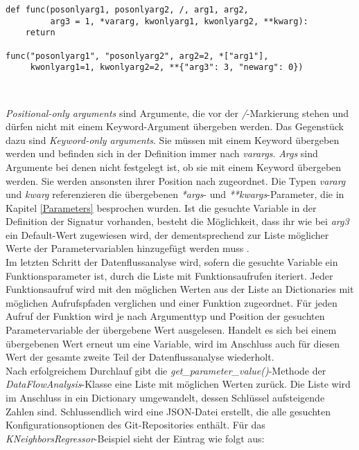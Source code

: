 \documentclass[german,bachelor]{swsLeipzig}
\begin{document}
\noindent\begin{minipage}{\linewidth}
\begin{lstlisting}[language=iPython, frame=single, basicstyle=\small, label=args, caption={Parametertypen von Funktionen},captionpos=b]
def func(posonlyarg1, posonlyarg2, /, arg1, arg2,
         arg3 = 1, *vararg, kwonlyarg1, kwonlyarg2, **kwarg):
    return

func("posonlyarg1", "posonlyarg2", arg2=2, *["arg1"],
     kwonlyarg1=1, kwonlyarg2=2, **{"arg3": 3, "newarg": 0})
\end{lstlisting}
\end{minipage}
\

\noindent \textit{Positional-only arguments} sind Argumente, die vor der \textit{/}-Markierung stehen und dürfen nicht mit einem
Keyword-Argument übergeben werden.
Das Gegenstück dazu sind \textit{Keyword-only arguments}.
Sie müssen mit einem Keyword übergeben werden und befinden sich in der Definition immer nach \textit{varargs}.
\textit{Args} sind Argumente bei denen nicht festgelegt ist, ob sie mit einem Keyword übergeben werden.
Sie werden ansonsten ihrer Position nach zugeordnet.
Die Typen \textit{vararg} und \textit{kwarg} referenzieren die übergebenen \textit{*args}- und \textit{**kwargs}-Parameter,
die in Kapitel \ref{Parameters} besprochen wurden.
Ist die gesuchte Variable in der Definition der Signatur vorhanden, besteht die Möglichkeit, dass ihr wie bei \textit{arg3} ein Default-Wert
zugewiesen wird, der dementsprechend zur Liste möglicher Werte der Parametervariablen hinzugefügt werden muss \cite[]{9425916}.\\
\indent Im letzten Schritt der Datenflussanalyse wird, sofern die gesuchte Variable ein Funktionsparameter ist,
durch die Liste mit Funktionsaufrufen iteriert.
Jeder Funktionsaufruf wird mit den möglichen Werten aus der Liste an Dictionaries mit möglichen Aufrufspfaden verglichen und
einer Funktion zugeordnet.
Für jeden Aufruf der Funktion wird je nach Argumenttyp und Position der gesuchten Parametervariable der übergebene
Wert ausgelesen.
Handelt es sich bei einem übergebenen Wert erneut um eine Variable, wird im Anschluss auch für diesen Wert
der gesamte zweite Teil der Datenflussanalyse wiederholt. \\

Nach erfolgreichem Durchlauf gibt die \textit{get\_parameter\_value()}-Methode der \textit{DataFlowAnalysis}-Klasse
eine Liste mit möglichen Werten zurück.
Die Liste wird im Anschluss in ein Dictionary umgewandelt, dessen Schlüssel aufsteigende Zahlen sind.
Schlussendlich wird eine JSON-Datei erstellt, die alle gesuchten Konfigurationsoptionen des Git-Repositories enthält.
Für das \textit{KNeighborsRegressor}-Beispiel sieht der Eintrag wie folgt aus: \\
\end{document}
